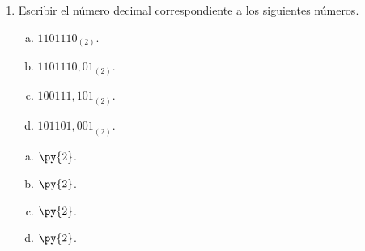 \documentclass[
	spanish,
	9pt,
	utf8,
	xcolor=table,
	handout,
	aspectratio=1610,
	professionalfonts,
	mathserif,
]{beamer}
\newcounter{savedenum}
\newcommand*{\saveenum}{\setcounter{savedenum}{\theenumi}}
\begin{document}
\begin{frame}

	\begin{enumerate}
		\item
		      Escribir el número decimal correspondiente a los siguientes números.

		      \begin{multicols}{4}
			      \begin{enumerate}[a)]
				      \item
				            ${1101110}_{\left(2\right)}$.

				      \item
				            $1101110,01_{\left(2\right)}$.

				      \item
				            ${100111,101}_{\left(2\right)}$.

				      \item
				            ${101101,001}_{\left(2\right)}$.
			      \end{enumerate}
		      \end{multicols}

		      \begin{solution}
			      \begin{enumerate}[a)]
				      \item
				            $\py{2}$.

				      \item
				            $\py{2}$.

				      \item
				            $\py{2}$.

				      \item
				            $\py{2}$.
			      \end{enumerate}
		      \end{solution}

		      \saveenum
	\end{enumerate}
\end{frame}
\end{document}
